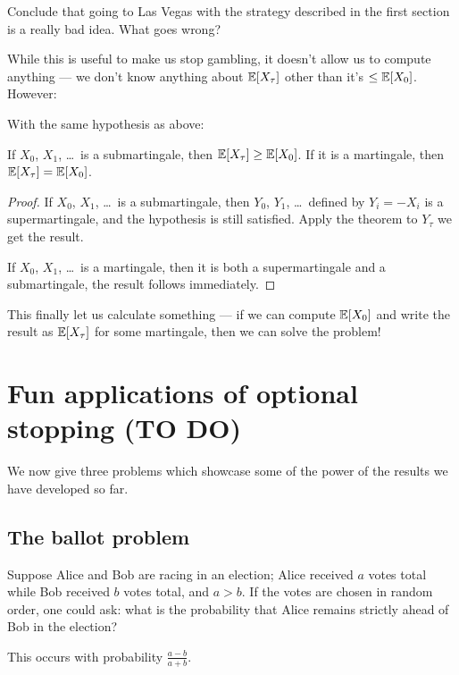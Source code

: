 \begin{exercise}
	Conclude that going to Las Vegas with the strategy
	described in the first section is a really bad idea.
	What goes wrong?
\end{exercise}

While this is useful to make us stop gambling, it doesn't allow us to compute anything ---
we don't know anything about $\mathbb E[X_\tau]$ other than it's $\leq \mathbb E[X_0]$.
However:
\begin{corollary}
	With the same hypothesis as above:
	\begin{itemize}
		\ii If $X_0$, $X_1$, \dots\ is a submartingale, then $\mathbb E[X_\tau] \geq \mathbb E[X_0]$.
		\ii If it is a martingale, then $\mathbb E[X_\tau] = \mathbb E[X_0]$.
	\end{itemize}
\end{corollary}
\begin{proof}
	If $X_0$, $X_1$, \dots\ is a submartingale, then $Y_0$, $Y_1$, \dots\ defined by $Y_i = -X_i$ is
	a supermartingale, and the hypothesis is still satisfied. Apply the theorem to $Y_\tau$ we
	get the result.

	If $X_0$, $X_1$, \dots\ is a martingale, then it is both a supermartingale and a submartingale,
	the result follows immediately.
\end{proof}
This finally let us calculate something --- if we can compute $\mathbb E[X_0]$ and write the result as
$\mathbb E[X_\tau]$ for some martingale, then we can solve the problem!

\section{Fun applications of optional stopping (TO DO)}
We now give three problems which showcase some of the power of
the results we have developed so far.

\subsection{The ballot problem}
Suppose Alice and Bob are racing in an election;
Alice received $a$ votes total while Bob received $b$ votes total, and $a > b$.
If the votes are chosen in random order,
one could ask: what is the probability that Alice remains strictly ahead of
Bob in the election?


\begin{proposition}
	This occurs with probability $\frac{a-b}{a+b}$.
\end{proposition}

